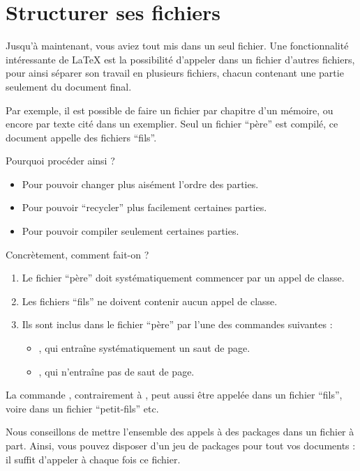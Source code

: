 \section{Structurer ses fichiers}\label{inclusion}

Jusqu'à maintenant, vous aviez tout mis dans un seul fichier. Une fonctionnalité intéressante de \LaTeX{} est la possibilité d'appeler dans un fichier d'autres fichiers, pour ainsi séparer son travail en plusieurs fichiers, chacun contenant une partie seulement du document final.

Par exemple, il est possible de faire un fichier par chapitre d'un mémoire, ou encore  par texte cité dans un exemplier. Seul un fichier \enquote{père} est compilé, ce document appelle des fichiers \enquote{fils}.

Pourquoi procéder ainsi ?
\begin{itemize}
\item Pour pouvoir changer plus aisément l'ordre des parties. 
\item Pour pouvoir \enquote{recycler} plus facilement certaines parties.
\item Pour pouvoir compiler seulement certaines parties.
\end{itemize}

Concrètement, comment fait-on ?
\begin{enumerate}
\item Le fichier \enquote{père} doit systématiquement commencer par un appel de classe.
\item Les fichiers \enquote{fils} ne doivent contenir aucun appel de classe.
\item Ils sont inclus dans le fichier \enquote{père} par l'une des commandes suivantes :
\begin{itemize}
    \item {}, qui entraîne systématiquement un saut de page.
    \item {}, qui n'entraîne pas de saut de page.\label{input}
\end{itemize}
\end{enumerate}

La commande , contrairement à , peut aussi être  appelée dans un fichier \enquote{fils}, voire dans un fichier \enquote{petit-fils} etc.

Nous conseillons de mettre l'ensemble des appels à des packages dans un fichier à part. Ainsi, vous pouvez disposer d'un jeu de packages pour tout vos documents : il suffit d'appeler à chaque fois ce fichier.


